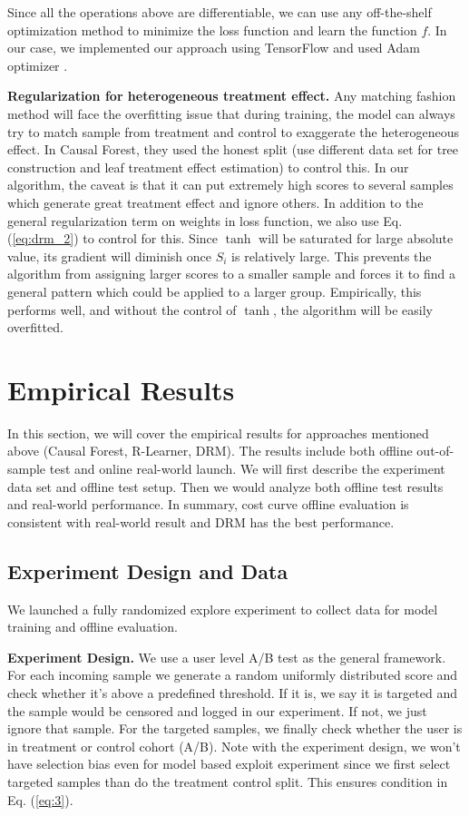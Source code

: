 Since all the operations above are differentiable, we can use any off-the-shelf optimization method to minimize the loss function and learn the function $f$. In our case, we implemented our approach using TensorFlow \cite{abadi2016tensorflow} and used Adam optimizer \cite{kingma2014adam}.

\textbf{Regularization for heterogeneous treatment effect.} Any matching fashion method will face the overfitting issue that during training, the model can always try to match sample from treatment and control to exaggerate the heterogeneous effect. In Causal Forest, they used the honest split (use different data set for tree construction and leaf treatment effect estimation) to control this. In our algorithm, the caveat is that it can put extremely high scores to several samples which generate great treatment effect and ignore others. In addition to the general regularization term on weights in loss function, we also use Eq. (\ref{eq:drm_2}) to control for this. Since $\tanh$ will be saturated for large absolute value, its gradient will diminish once $S_i$ is relatively large. This prevents the algorithm from assigning larger scores to a smaller sample and forces it to find a general pattern which could be applied to a larger group. Empirically, this performs well, and without the control of $\tanh$, the algorithm will be easily overfitted.

\section{Empirical Results}
In this section, we will cover the empirical results for approaches mentioned above (Causal Forest, R-Learner, DRM). The results include both offline out-of-sample test and online real-world launch. We will first describe the experiment data set and offline test setup. Then we would analyze both offline test results and real-world performance. In summary, cost curve offline evaluation is consistent with real-world result and DRM has the best performance.

\subsection{Experiment Design and Data} \label{experiment design and ata}
We launched a fully randomized explore experiment to collect data for model training and offline evaluation.

\textbf{Experiment Design.} We use a user level A/B test as the general framework. For each incoming sample we generate a random uniformly distributed score and check whether it's above a predefined threshold. If it is, we say it is targeted and the sample would be censored and logged in our experiment. If not, we just ignore that sample. For the targeted samples, we finally check whether the user is in treatment or control cohort (A/B). Note with the experiment design, we won't have selection bias even for model based exploit experiment since we first select targeted samples than do the treatment control split. This ensures condition in Eq. (\ref{eq:3}).

